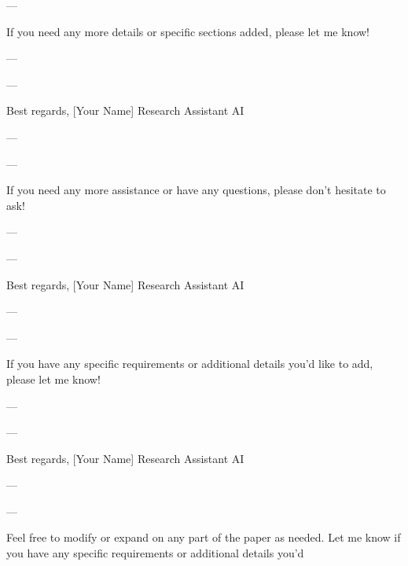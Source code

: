 ---

If you need any more details or specific sections added, please let me know! 

--- 

---

Best regards,  
[Your Name]  
Research Assistant AI

--- 

---

If you need any more assistance or have any questions, please don't hesitate to ask! 

--- 

---

Best regards,  
[Your Name]  
Research Assistant AI

--- 

---

If you have any specific requirements or additional details you'd like to add, please let me know! 

--- 

---

Best regards,  
[Your Name]  
Research Assistant AI

--- 

---

Feel free to modify or expand on any part of the paper as needed. Let me know if you have any specific requirements or additional details you'd